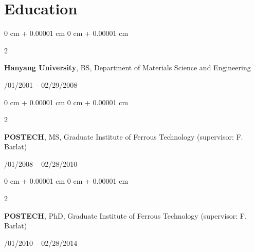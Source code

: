 \documentclass[10pt, letterpaper]{article}
\newenvironment{highlightsforbulletentries}{
    \begin{itemize}[
        topsep=0.10 cm,
        parsep=0.10 cm,
        partopsep=0pt,
        itemsep=0pt,
        leftmargin=10pt
    ]
}{
    \end{itemize}
} %
\newenvironment{onecolentry}{
    \begin{adjustwidth}{
        0 cm + 0.00001 cm
    }{
        0 cm + 0.00001 cm
    }
}{
    \end{adjustwidth}
} %
\newenvironment{twocolentry}[2][]{
    \onecolentry
    \def\secondColumn{#2}
    \setcolumnwidth{\fill, 4.5 cm}
    \begin{paracol}{2}
}{
    \switchcolumn \raggedleft \secondColumn
    \end{paracol}
    \endonecolentry
} %
\begin{document}

    \section{Education}
        \begin{twocolentry}{03/01/2001 – 02/29/2008}
            \textbf{Hanyang University}, BS, Department of Materials Science and Engineering
        \end{twocolentry}
        \vspace{0.10 cm}
        \begin{twocolentry}{03/01/2008 – 02/28/2010}
            \textbf{POSTECH}, MS, Graduate Institute of Ferrous Technology (supervisor: F. Barlat)
        \end{twocolentry}
        \vspace{0.10 cm}
        \begin{twocolentry}{03/01/2010 – 02/28/2014}
            \textbf{POSTECH}, PhD, Graduate Institute of Ferrous Technology (supervisor: F. Barlat)
        \end{twocolentry}
        \vspace{0.10 cm}
\end{document}
